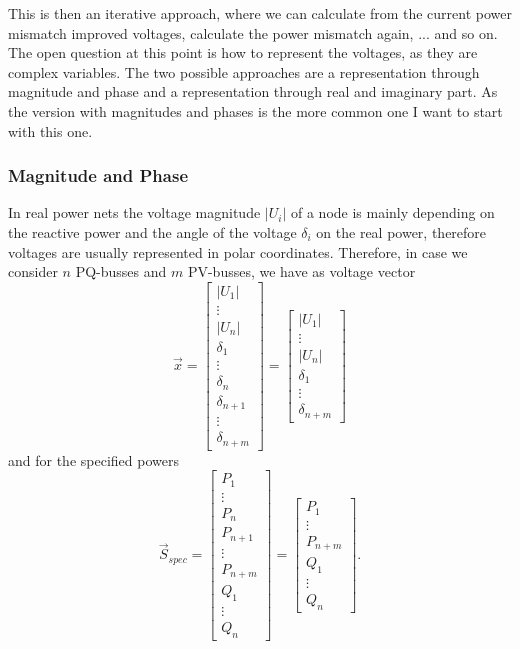 This is then an iterative approach, where we can calculate from the current power mismatch improved voltages, calculate the power mismatch again, ... and so on. The open question at this point is how to represent the voltages, as they are complex variables. The two possible approaches are a representation through magnitude and phase and a representation through real and imaginary part. As the version with magnitudes and phases is the more common one I want to start with this one.

\subsubsection{Magnitude and Phase}
In real power nets the voltage magnitude $|U_i|$ of a node is mainly depending on the reactive power and the angle of the voltage $\delta_i$ on the real power, therefore voltages are usually represented in polar coordinates. Therefore, in case we consider $n$ PQ-busses and $m$ PV-busses, we have as voltage vector 
\begin{equation}
	\vec x = 
	\begin{bmatrix}
		|U_1| \\
		\vdots \\
		|U_n| \\
		\delta_1 \\
		\vdots \\
		\delta_n \\
		\delta_{n + 1} \\
		\vdots \\
		\delta_{n + m} 
	\end{bmatrix} = 	
	\begin{bmatrix}
		|U_1| \\
		\vdots \\
		|U_n| \\
		\delta_1 \\
		\vdots \\
		\delta_{n + m} 
	\end{bmatrix}
\end{equation}
and for the specified powers
\begin{equation}
	\vec S_{spec} = 
	\begin{bmatrix}
		P_1 \\
		\vdots \\
		P_n \\
		P_{n + 1} \\
		\vdots \\
		P_{n + m} \\
		Q_1 \\
		\vdots \\
		Q_n
	\end{bmatrix} = 
	\begin{bmatrix}
		P_1 \\
		\vdots \\
		P_{n + m} \\
		Q_1 \\
		\vdots \\
		Q_n
	\end{bmatrix}.
\end{equation}

